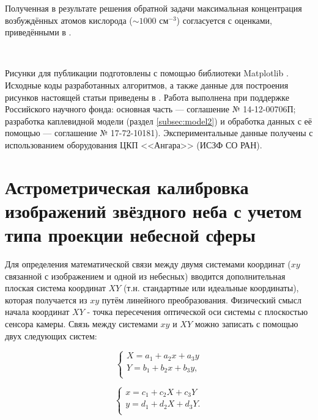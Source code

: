 \documentclass[12pt,a4paper]{article}
\begin{document}
Полученная в результате решения обратной задачи максимальная концентрация возбуждённых атомов кислорода ($\sim1000$ см$^{-3}$) согласуется с оценками, приведёнными в \cite{Klimenko2017}.


~\

Рисунки для публикации подготовлены с помощью библиотеки Mat\-plotlib \cite{Hunter2007}. Исходные коды разработанных алгоритмов, а также данные для построения рисунков настоящей статьи приведены в \cite{Shindin2017}.
Работа выполнена при поддержке Российского научного фонда: основная часть --- соглашение № 14-12-00706П; разработка каплевидной модели (раздел \ref{subsec:model2}) и обработка данных с её помощью --- соглашение № 17-72-10181). Экспериментальные данные получены с использованием оборудования ЦКП <<Ангара>> (ИСЗФ СО РАН). 

\renewcommand{\thesection}{\Asbuk{section}}

\appendix
\titleformat{\section}[display]
{\normalfont\Large\bfseries}{Приложение \thesection}{0pt}{\Large}

\section{Астрометрическая калибровка изображений звёздного неба с учетом типа проекции небесной сферы} \label{app:astrometric}

Для определения математической связи между двумя системами координат ($xy$ связанной с изображением и одной из небесных) вводится дополнительная плоская система координат $XY$ (т.н. стандартные или идеальные координаты), которая получается из $xy$ путём линейного преобразования. Физический смысл начала координат $XY$ - точка пересечения оптической оси системы с плоскостью сенсора камеры. Связь между системами $xy$ и $XY$ можно записать с помощью двух следующих систем:

\begin{equation}\label{eq:eq1}
\begin{cases}
X = a_1 + a_2 x +a_3 y\\
Y = b_1 + b_2 x +b_3 y,\\
\end{cases}
\end{equation}

\begin{equation}\label{eq:eq2}
\begin{cases}
x = c_1 + c_2 X +c_3 Y\\
y = d_1 + d_2 X +d_3 Y.\\
\end{cases}
\end{equation}
\end{document}
